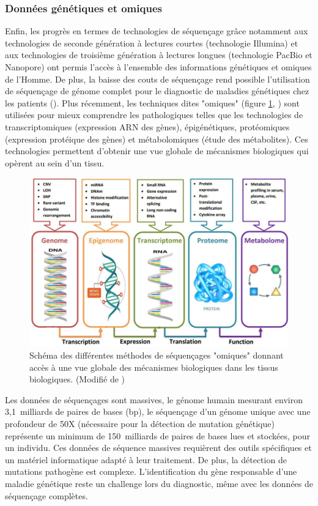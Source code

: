 \subsubsection{Données génétiques et omiques}
Enfin, les progrès en termes de technologies de séquençage grâce notamment aux technologies de seconde génération à lectures courtes (technologie Illumina) et aux technologies de troisième génération à lectures longues (technologie PacBio et Nanopore) ont permis l'accès à l'ensemble des informations génétiques et omiques de l'Homme. De plus, la baisse des couts de séquençage rend possible l'utilisation de séquençage de génome complet pour le diagnostic de maladies génétiques chez les patients (\cite{rabbani_next-generation_2012}). Plus récemment, les techniques dites "omiques" (figure \ref{fig:intro-omics}, \cite{momeni_survey_2020}) sont utilisées pour mieux comprendre les pathologiques telles que les technologies de transcriptomiques (expression ARN des gènes), épigénétiques, protéomiques (expression protéique des gènes) et métabolomiques (étude des métabolites). Ces technologies permettent d'obtenir une vue globale de mécanismes biologiques qui opèrent au sein d'un tissu. 
\begin{figure}[!ht]
 \centering
 \includegraphics[width=1\textwidth]{figures/intro_omics.png}
 \caption[Méthodes de séquençages "omiques"]{Schéma des différentes méthodes de séquençages "omiques" donnant accès à une vue globale des mécanismes biologiques dans les tissus biologiques. (Modifié de \cite{momeni_survey_2020})}
 \label{fig:intro-omics}
\end{figure}
Les données de séquençages sont massives, le génome humain mesurant environ 3,1~milliards de paires de bases (bp), le séquençage d'un génome unique avec une profondeur de 50X (nécessaire pour la détection de mutation génétique) représente un minimum de 150~milliards de paires de bases lues et stockées, pour un individu. Ces données de séquence massives requièrent des outils spécifiques et un matériel informatique adapté à leur traitement. De plus, la détection de mutations pathogène est complexe. L'identification du gène responsable d'une maladie génétique reste un challenge lors du diagnostic, même avec les données de séquençage complètes.

